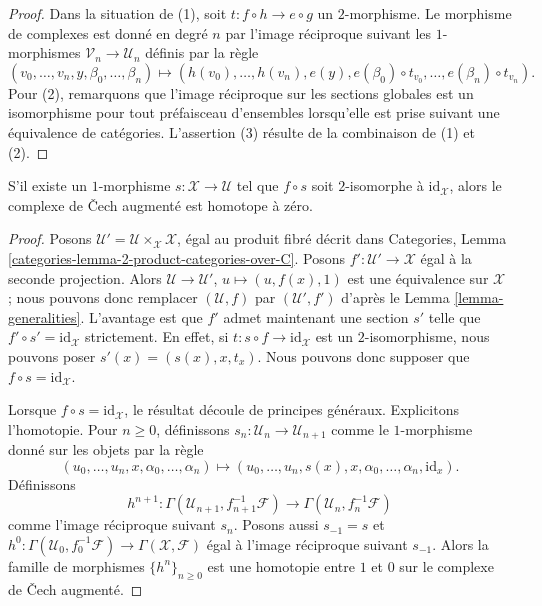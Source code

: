 \begin{proof}
Dans la situation de (1), soit $t : f \circ h \to e \circ g$ un $2$-morphisme.
Le morphisme de complexes est donné en degré $n$ par
l'image réciproque suivant les $1$-morphismes
$\mathcal{V}_n \to \mathcal{U}_n$ définis par la règle
$$
(v_0, \ldots, v_n, y, \beta_0, \ldots, \beta_n)
\longmapsto
(h(v_0), \ldots, h(v_n), e(y),
e(\beta_0) \circ t_{v_0}, \ldots, e(\beta_n) \circ t_{v_n}).
$$
Pour (2), remarquons que l'image réciproque sur les sections globales est un isomorphisme
pour tout préfaisceau d'ensembles lorsqu'elle est prise suivant une équivalence
de catégories. L'assertion (3) résulte de la combinaison de (1) et (2).
\end{proof}

\begin{lemma}
\label{lemma-homotopy}
S'il existe un $1$-morphisme $s : \mathcal{X} \to \mathcal{U}$
tel que $f \circ s$ soit $2$-isomorphe à $\text{id}_\mathcal{X}$,
alors le complexe de {\v C}ech augmenté est homotope à zéro.
\end{lemma}

\begin{proof}
Posons $\mathcal{U}' = \mathcal{U} \times_\mathcal{X} \mathcal{X}$,
égal au produit fibré décrit dans
Categories, Lemma \ref{categories-lemma-2-product-categories-over-C}.
Posons $f' : \mathcal{U}' \to \mathcal{X}$ égal à la seconde projection.
Alors $\mathcal{U} \to \mathcal{U}'$, $u \mapsto (u, f(x), 1)$
est une équivalence sur $\mathcal{X}$ ; nous pouvons donc remplacer
$(\mathcal{U}, f)$ par $(\mathcal{U}', f')$ d'après le
Lemma \ref{lemma-generalities}.
L'avantage est que $f'$ admet maintenant une section $s'$ telle
que $f' \circ s' = \text{id}_\mathcal{X}$ strictement. En effet, si
$t : s \circ f \to \text{id}_\mathcal{X}$ est un $2$-isomorphisme,
nous pouvons poser $s'(x) = (s(x), x, t_x)$. Nous pouvons donc supposer que
$f \circ s = \text{id}_\mathcal{X}$.

\medskip\noindent
Lorsque $f \circ s = \text{id}_\mathcal{X}$, le résultat découle
de principes généraux. Explicitons l'homotopie. Pour
$n \geq 0$, définissons $s_n : \mathcal{U}_n \to \mathcal{U}_{n + 1}$
comme le $1$-morphisme donné sur les objets par la règle
$$
(u_0, \ldots, u_n, x, \alpha_0, \ldots, \alpha_n)
\longmapsto
(u_0, \ldots, u_n, s(x), x,
\alpha_0, \ldots, \alpha_n, \text{id}_x).
$$
Définissons
$$
h^{n + 1} :
\Gamma(\mathcal{U}_{n + 1}, f_{n + 1}^{-1}\mathcal{F})
\longrightarrow
\Gamma(\mathcal{U}_n, f_n^{-1}\mathcal{F})
$$
comme l'image réciproque suivant $s_n$. Posons aussi $s_{-1} = s$ et
$h^0 : \Gamma(\mathcal{U}_0, f_0^{-1}\mathcal{F}) \to
\Gamma(\mathcal{X}, \mathcal{F})$ égal à l'image réciproque suivant $s_{-1}$.
Alors la famille de morphismes $\{h^n\}_{n \geq 0}$ est une homotopie entre
$1$ et $0$ sur le complexe de {\v C}ech augmenté.
\end{proof}









